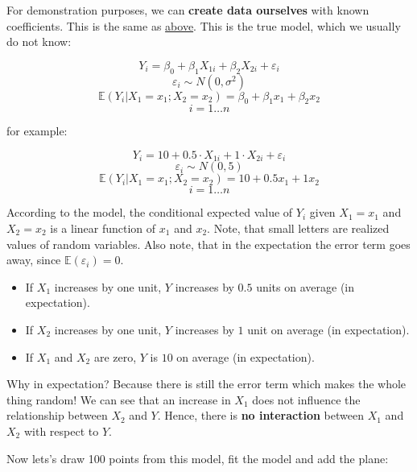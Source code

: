 \documentclass[
]{book}
\providecommand{\tightlist}{%
  \setlength{\itemsep}{0pt}\setlength{\parskip}{0pt}}
\begin{document}
For demonstration purposes, we can \textbf{create data ourselves} with known
coefficients. This is the same as \hyperref[adding_predictor_bayes]{above}.
This is the true model, which we usually do not know:

\[ Y_i = \beta_0 + \beta_1 X_{1i} + \beta_2 X_{2i} + \varepsilon_i\]
\[ \varepsilon_i \sim N(0, \sigma^2)\]
\[ \mathbb{E}(Y_i|X_1 = x_1; X_2 = x_2) = \beta_0 + \beta_1 x_1 + \beta_2 x_2\]
\[ i = 1 \ldots n\]

for example:

\[ Y_i = 10 + 0.5 \cdot X_{1i} + 1 \cdot X_{2i} + \varepsilon_i\]
\[ \varepsilon_i \sim N(0, 5)\]
\[ \mathbb{E}(Y_i|X_1 = x_1; X_2 = x_2) = 10 + 0.5 x_1 + 1 x_2\]
\[ i = 1 \ldots n\]

According to the model, the conditional expected value of \(Y_i\) given \(X_1 = x_1\) and \(X_2 = x_2\)
is a linear function of \(x_1\) and \(x_2\). Note, that small letters are realized values
of random variables. Also note, that in the expectation the error term goes away, since
\(\mathbb{E}(\varepsilon_i) = 0\).

\begin{itemize}
\tightlist
\item
  If \(X_1\) increases by one unit, \(Y\) increases by \(0.5\) units on average (in expectation).
\item
  If \(X_2\) increases by one unit, \(Y\) increases by \(1\) unit on average (in expectation).
\item
  If \(X_1\) and \(X_2\) are zero, \(Y\) is \(10\) on average (in expectation).
\end{itemize}

Why in expectation? Because there is still the error term which makes the whole thing random!
We can see that an increase in \(X_1\) does not influence the relationship between \(X_2\) and \(Y\).
Hence, there is \textbf{no interaction} between \(X_1\) and \(X_2\) with respect to \(Y\).

Now lets's draw 100 points from this model, fit the model and add the plane:
\end{document}
